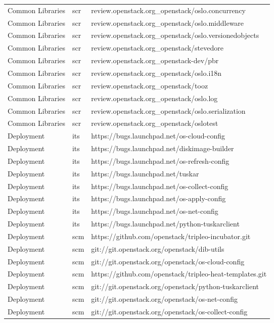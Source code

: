 \begin{center}
\begin{longtable}{|p{4cm}|p{1cm}|p{10cm}|}
Common Libraries&scr&review.openstack.org\_openstack/oslo.concurrency\\
Common Libraries&scr&review.openstack.org\_openstack/oslo.middleware\\
Common Libraries&scr&review.openstack.org\_openstack/oslo.versionedobjects\\
Common Libraries&scr&review.openstack.org\_openstack/stevedore\\
Common Libraries&scr&review.openstack.org\_openstack-dev/pbr\\
Common Libraries&scr&review.openstack.org\_openstack/oslo.i18n\\
Common Libraries&scr&review.openstack.org\_openstack/tooz\\
Common Libraries&scr&review.openstack.org\_openstack/oslo.log\\
Common Libraries&scr&review.openstack.org\_openstack/oslo.serialization\\
Common Libraries&scr&review.openstack.org\_openstack/oslotest\\
Deployment&its&https://bugs.launchpad.net/os-cloud-config\\
Deployment&its&https://bugs.launchpad.net/diskimage-builder\\
Deployment&its&https://bugs.launchpad.net/os-refresh-config\\
Deployment&its&https://bugs.launchpad.net/tuskar\\
Deployment&its&https://bugs.launchpad.net/os-collect-config\\
Deployment&its&https://bugs.launchpad.net/os-apply-config\\
Deployment&its&https://bugs.launchpad.net/os-net-config\\
Deployment&its&https://bugs.launchpad.net/python-tuskarclient\\
Deployment&scm&https://github.com/openstack/tripleo-incubator.git\\
Deployment&scm&git://git.openstack.org/openstack/dib-utils\\
Deployment&scm&git://git.openstack.org/openstack/os-cloud-config\\
Deployment&scm&https://github.com/openstack/tripleo-heat-templates.git\\
Deployment&scm&git://git.openstack.org/openstack/python-tuskarclient\\
Deployment&scm&git://git.openstack.org/openstack/os-net-config\\
Deployment&scm&git://git.openstack.org/openstack/os-collect-config\\

\end{longtable}
\end{center}
